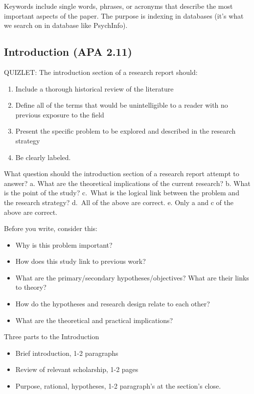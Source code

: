 \documentclass[
  english,
]{book}
\providecommand{\tightlist}{%
  \setlength{\itemsep}{0pt}\setlength{\parskip}{0pt}}
\begin{document}
Keywords include single words, phrases, or acronyms that describe the most important aspects of the paper. The purpose is indexing in databases (it's what we search on in database like PsychInfo).

\hypertarget{introduction-apa-2.11}{%
\subsection{Introduction (APA 2.11)}\label{introduction-apa-2.11}}

QUIZLET:
The introduction section of a research report should:

\begin{enumerate}
\def\labelenumi{\alph{enumi}.}
\tightlist
\item
  Include a thorough historical review of the literature
\item
  Define all of the terms that would be unintelligible to a reader with no previous exposure to the field
\item
  Present the specific problem to be explored and described in the research strategy
\item
  Be clearly labeled.
\end{enumerate}

What question should the introduction section of a research report attempt to answer?
a. What are the theoretical implications of the current research?
b. What is the point of the study?
c.~What is the logical link between the problem and the research strategy?
d.~All of the above are correct.
e. Only a and c of the above are correct.

Before you write, consider this:

\begin{itemize}
\tightlist
\item
  Why is this problem important?
\item
  How does this study link to previous work?
\item
  What are the primary/secondary hypotheses/objectives? What are their links to theory?
\item
  How do the hypotheses and research design relate to each other?
\item
  What are the theoretical and practical implications?
\end{itemize}

Three parts to the Introduction

\begin{itemize}
\tightlist
\item
  Brief introduction, 1-2 paragraphs
\item
  Review of relevant scholarship, 1-2 pages
\item
  Purpose, rational, hypotheses, 1-2 paragraph's at the section's close.
\end{itemize}
\end{document}
